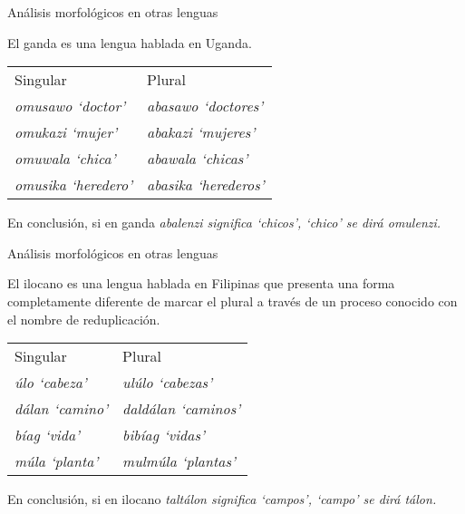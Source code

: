 \documentclass{beamer}
\begin{document}
\begin{frame}{Análisis morfológicos en otras lenguas}

El ganda es una lengua hablada en Uganda.

\begin{center}
\begin{tabular}{l l}
Singular & Plural \\
\it{omusawo} `doctor' & \it{abasawo} `doctores'\\
\it{omukazi} `mujer' & \it{abakazi} `mujeres'\\
\it{omuwala} `chica' & \it{abawala} `chicas'\\
\it{omusika} `heredero' & \it{abasika} `herederos'\\
\end{tabular}
\end{center}

En conclusión, si en ganda \it{abalenzi} significa `chicos', `chico' se dirá \pause \it{omulenzi}. \\

\end{frame}

\begin{frame}{Análisis morfológicos en otras lenguas}

El ilocano es una lengua hablada en Filipinas que presenta una forma completamente diferente de marcar el plural a través de un proceso conocido con el nombre de reduplicación.

\begin{center}
\begin{tabular}{l l}
Singular & Plural \\
\it{úlo} `cabeza' & \it{ulúlo} `cabezas'\\
\it{dálan} `camino' & \it{daldálan} `caminos'\\
\it{bíag} `vida' & \it{bibíag} `vidas'\\
\it{múla} `planta' & \it{mulmúla} `plantas'\\
\end{tabular}
\end{center}

En conclusión, si en ilocano \it{taltálon} significa `campos', `campo' se dirá \pause \it{tálon}. \\

\end{frame}
\end{document}
